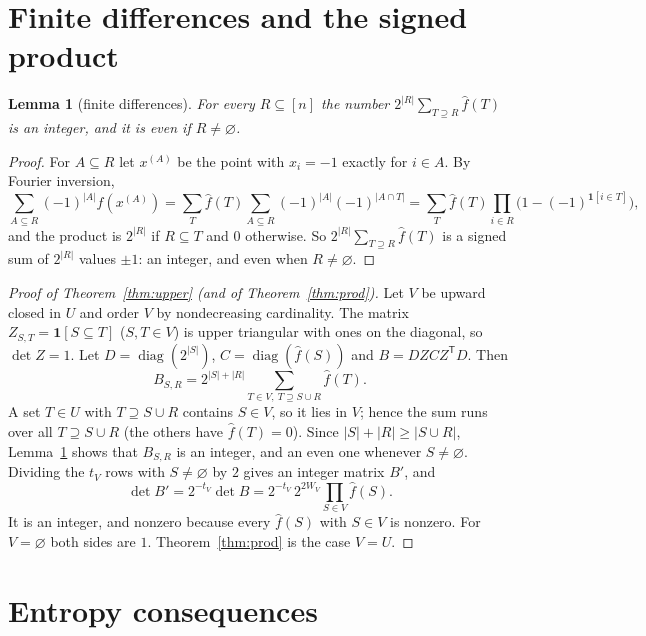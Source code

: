 \documentclass[11pt]{article}
\newtheorem{lemma}{Lemma}
\theoremstyle{definition}
\theoremstyle{remark}
\begin{document}
\section{Finite differences and the signed product}\label{sec:prod}

\begin{lemma}[finite differences]\label{lem:tail}
For every $R\subseteq[n]$ the number $2^{|R|}\sum_{T\supseteq R}\hat f(T)$ is an
integer, and it is even if $R\ne\varnothing$.
\end{lemma}

\begin{proof}
For $A\subseteq R$ let $x^{(A)}$ be the point with $x_i=-1$ exactly for
$i\in A$. By Fourier inversion,
\[
\sum_{A\subseteq R}(-1)^{|A|}f(x^{(A)})=\sum_T\hat f(T)\sum_{A\subseteq R}(-1)^{|A|}(-1)^{|A\cap T|}
=\sum_T\hat f(T)\prod_{i\in R}\bigl(1-(-1)^{\mathbf 1[i\in T]}\bigr),
\]
and the product is $2^{|R|}$ if $R\subseteq T$ and $0$ otherwise. So
$2^{|R|}\sum_{T\supseteq R}\hat f(T)$ is a signed sum of $2^{|R|}$ values $\pm1$:
an integer, and even when $R\ne\varnothing$.
\end{proof}

\begin{proof}[Proof of Theorem~\ref{thm:upper} (and of Theorem~\ref{thm:prod})]
Let $V$ be upward closed in $U$ and order $V$ by nondecreasing cardinality.
The matrix $Z_{S,T}=\mathbf 1[S\subseteq T]$ ($S,T\in V$) is upper triangular
with ones on the diagonal, so $\det Z=1$. Let $D=\operatorname{diag}(2^{|S|})$,
$C=\operatorname{diag}(\hat f(S))$ and $B=DZCZ^{\mathsf T}D$. Then
\[
B_{S,R}=2^{|S|+|R|}\sum_{T\in V,\ T\supseteq S\cup R}\hat f(T).
\]
A set $T\in U$ with $T\supseteq S\cup R$ contains $S\in V$, so it lies in $V$;
hence the sum runs over all $T\supseteq S\cup R$ (the others have
$\hat f(T)=0$). Since $|S|+|R|\ge|S\cup R|$, Lemma~\ref{lem:tail} shows that
$B_{S,R}$ is an integer, and an even one whenever $S\ne\varnothing$. Dividing
the $t_V$ rows with $S\ne\varnothing$ by $2$ gives an integer matrix $B'$, and
\[
\det B'=2^{-t_V}\det B=2^{-t_V}\,2^{2W_V}\prod_{S\in V}\hat f(S).
\]
It is an integer, and nonzero because every $\hat f(S)$ with $S\in V$ is
nonzero. For $V=\varnothing$ both sides are $1$. Theorem~\ref{thm:prod} is the
case $V=U$.
\end{proof}

\section{Entropy consequences}\label{sec:entropy}
\end{document}
